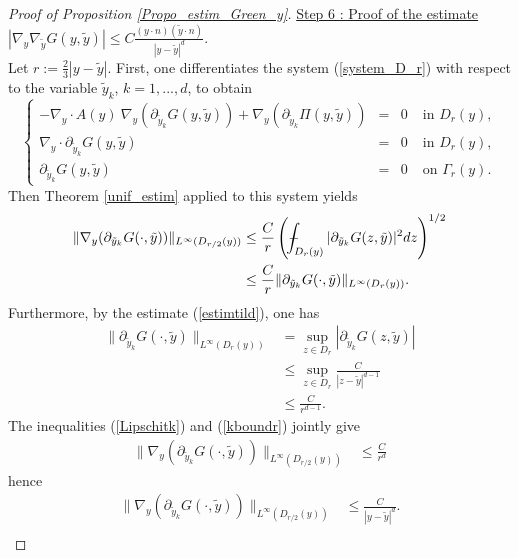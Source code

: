 \documentclass[11pt, reqno]{amsart}
\theoremstyle{definition}
\theoremstyle{remark}
\numberwithin{equation}{section}
\def\Xint#1{\mathchoice
	{\XXint\displaystyle\textstyle{#1}}%
	{\XXint\textstyle\scriptstyle{#1}}%
	{\XXint\scriptstyle\scriptscriptstyle{#1}}%
	{\XXint\scriptscriptstyle\scriptscriptstyle{#1}}%
	\!\int}
\def\XXint#1#2#3{{\setbox0=\hbox{$#1{#2#3}{\int}$ }
		\vcenter{\hbox{$#2#3$ }}\kern-.6\wd0}}
\def\dashint{\Xint-}        %
\begin{document}
\begin{appendices}
\begin{proof}[Proof of \textup{Proposition \ref{Propo_estim_Green_y}}]
		
		\noindent \underline{Step 6 : Proof of the estimate}  $| \nabla_y \nabla_{\tilde{y}}G(y,\tilde{y})| \leq C  \frac{(y\cdot n)(\tilde{y}\cdot n) }{|y-\tilde{y}|^d} .$\\
		Let  $r:=\frac{2}{3}|y-\tilde{y}|.$ 
		First, one differentiates the system (\ref{system_D_r}) with respect to the variable  $\tilde{y}_k$, $k=1,...,d$,  to obtain 
		\begin{equation}
			\left\{
			\begin{array}{rcll}
				-\nabla_y\cdot A(y) \: \nabla_y ( \partial_{\tilde{y}_k}G(y,\tilde{y}) )  +  \nabla_y  ( \partial_{\tilde{y}_k} \Pi(y,\tilde{y}) ) &=& 0 \ &\mbox{in } D_r(y),\\
				\nabla_y\cdot  \partial_{\tilde{y}_k}G(y,\tilde{y})&=& 0 \;   & \mbox{in }  D_r(y),\\
				\partial_{\tilde{y}_k}G(y,\tilde{y}) &=& 0  & \mbox{on } \Gamma_r(y).
			\end{array}
			\right. 
		\end{equation}	
		Then Theorem \ref{unif_estim} applied to this system yields 
		\begin{align}
			\|\nabla_y  (  \partial_{\tilde{y}_k} G(\cdot,\tilde{y}) )\|_{L^{\infty}(D_{r/2}(y))} &\leq \frac{C}{r}  \left(  \dashint_{D_{r}(y)} |  \partial_{\tilde{y}_k} G(z,\tilde{y})|^2 dz \right)^{1/2}\nonumber \\
			&\leq \frac{C}{r} \| \partial_{\tilde{y}_k}   G(\cdot,\tilde{y})\|_{L^{\infty}(D_{r}(y))}. \label{Lipschitk}
		\end{align}
		Furthermore, by the estimate (\ref{estimtild}), one has
		\begin{align}
			\|  \partial_{\tilde{y}_k}  G(\cdot,\tilde{y})\|_{L^{\infty}(D_{r}(y))}&= \sup_{z\in{D_{r}}}  |  \partial_{\tilde{y}_k}  G(z,\tilde{y})| \nonumber\\
			&\leq \sup_{z\in{D_{r}}}   \frac{C }{|z-\tilde{y}|^{d-1}}\nonumber\\
			&\leq   \frac{C }{r^{d-1}}. \label{kboundr}
		\end{align}
		The inequalities  (\ref{Lipschitk}) and (\ref{kboundr}) jointly give
		\begin{align}
			\|\nabla_y (\partial_{\tilde{y}_k}  G (\cdot,\tilde{y}) )\|_{L^{\infty}(D_{r/2}(y))} 
			&\leq   \frac{C }{r^d} \nonumber
		\end{align}
		hence
		\begin{align*}
			\|\nabla_y ( \partial_{\tilde{y}_k}   G(\cdot,\tilde{y}) )\|_{L^{\infty}(D_{r/2}(y))} 
			&\leq   \frac{C }{|y-\tilde{y}|^d} .\\

\end{align*}
\end{proof}
\end{appendices}
\end{document}
